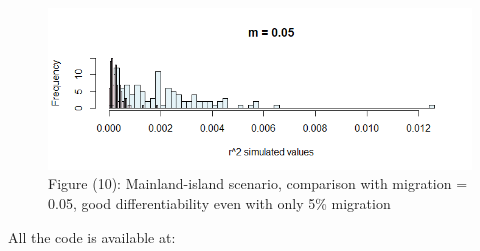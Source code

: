 \documentclass[a4paper,12pt]{article}
\begin{document}
\begin{figure}[H]
    
    \includegraphics[scale=0.8]{10.png}%
    \caption*{Figure (10): Mainland-island scenario, comparison with migration = 0.05, good differentiability even with only 5\% migration
}%
\end{figure}%
All the code is available at:\\
\end{document}

